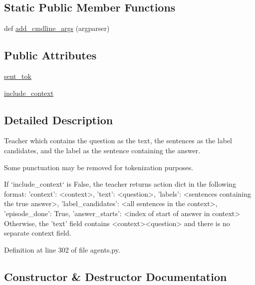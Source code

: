\subsection*{Static Public Member Functions}
\begin{DoxyCompactItemize}
\item 
def \hyperlink{classparlai_1_1tasks_1_1squad_1_1agents_1_1FulldocsentenceTeacher_af4fae24533376a66d54c771b6c8d06b7}{add\+\_\+cmdline\+\_\+args} (argparser)
\end{DoxyCompactItemize}
\subsection*{Public Attributes}
\begin{DoxyCompactItemize}
\item 
\hyperlink{classparlai_1_1tasks_1_1squad_1_1agents_1_1FulldocsentenceTeacher_a3ad4365c2ebc8896e90e8b478eeb68ed}{sent\+\_\+tok}
\item 
\hyperlink{classparlai_1_1tasks_1_1squad_1_1agents_1_1FulldocsentenceTeacher_a1861bd0d07fa2488073e0292513187dc}{include\+\_\+context}
\end{DoxyCompactItemize}


\subsection{Detailed Description}
\begin{DoxyVerb}Teacher which contains the question as the text, the sentences as the label
candidates, and the label as the sentence containing the answer.

Some punctuation may be removed for tokenization purposes.

If `include_context` is False, the teacher returns action dict in the
following format:
{
    'context': <context>,
    'text': <question>,
    'labels': <sentences containing the true answer>,
    'label_candidates': <all sentences in the context>,
    'episode_done': True,
    'answer_starts': <index of start of answer in context>
}
Otherwise, the 'text' field contains <context>\n<question> and there is
no separate context field.
\end{DoxyVerb}
 

Definition at line 302 of file agents.\+py.



\subsection{Constructor \& Destructor Documentation}
\mbox{\label{classparlai_1_1tasks_1_1squad_1_1agents_1_1FulldocsentenceTeacher_a0d38880d3b8ab12f4af6b95a5aa5e57f}} 
